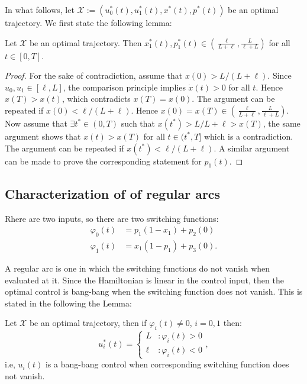 In what follows, let $\mathscr X:=(u_0^*(t),u_1^*(t),x^*(t), p^*(t))$ be an optimal trajectory.   We first state the following lemma:

\begin{lemma} \label{l.bounds}
	Let $\mathscr X$ be an optimal trajectory. Then $x_1^*(t), p_1^*(t)  \in ( \tfrac{\ell}{L+\ell}, \tfrac L{\ell+L})$ for all $t \in [0,T]$.
\end{lemma}

\begin{proof}
	For the sake of contradiction, assume that $x(0) > L/(L+\ell)$. Since $u_0,u_1 \in [\ell,L]$, the comparison principle  implies $\dot x (t) > 0 $ for all $t$. Hence $x(T)>x(t)$, which contradicts $x(T)=x(0)$. The argument can be repeated if $x(0)< \ell/(L+\ell)$. Hence $x(0)=x(T) \in ( \tfrac{\ell}{L+\ell}, \tfrac L{\ell+L})$. Now assume that $\exists t^* \in (0,T)$ such that $x(t^*) > L/{L+\ell}>x(T)$, the same argument shows that $x(t)>x(T)$ for all $t \in (t^*,T]$ which is a contradiction. The argument can be repeated if $x(t^*) < \ell /(L+\ell)$. A similar argument can be made to prove the corresponding statement for $p_1(t)$.  
\end{proof}

\subsection{Characterization of of regular arcs}

Rhere are two inputs, so there are two switching functions: 
\begin{subequations}
	\begin{align}
		\varphi_0(t)& = p_1 (1-x_1)+p_2(0) \\
		\varphi_1(t)&= x_1 (1-p_1) + p_3(0) . 
	\end{align}
\end{subequations}

A regular arc is one in which the switching functions do not vanish when evaluated at it.
Since the Hamiltonian is linear in the control input, then the optimal control is bang-bang when the switching function does not vanish. 
This is stated in the following the Lemma:
\begin{lemma} \label{l.bang}
	Let $\mathscr X$ be an optimal trajectory, then if $\varphi_i(t) \ne 0$, $i=0,1$ then:
	\begin{equation}
		u_i^*(t)= \left \{ \begin{array}{rl} L &:  \varphi_i(t) > 0 \\
			\ell &: \varphi_i(t)<0  \end{array} \right . ,
	\end{equation} 
	i.e, $u_i(t)$ is a bang-bang control when corresponding switching function does not vanish.
\end{lemma}

